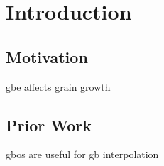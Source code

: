 \documentclass{beamer}
\title[5DOF Property Interpolation]{\mytitle{}}
\begin{document}

\author[Baird, Homer, Fullwood, Johnson] %
{S.~G.~Baird \and E.~R.~Homer \and D.~T.~Fullwood \and O.~K.~Johnson}


\date[TMS 2021 Virtual]{TMS 2021 Virtual}
\frame{\titlepage}

\frame{\tableofcontents[]}

\section{Introduction}
\subsection{Motivation}

\begin{frame}{\Gls{gbe} affects grain growth}

\end{frame}

\subsection{Prior Work}

\begin{frame}{\Glspl{gbo} are useful for \gls{gb} interpolation}

\end{frame}
\end{document}

